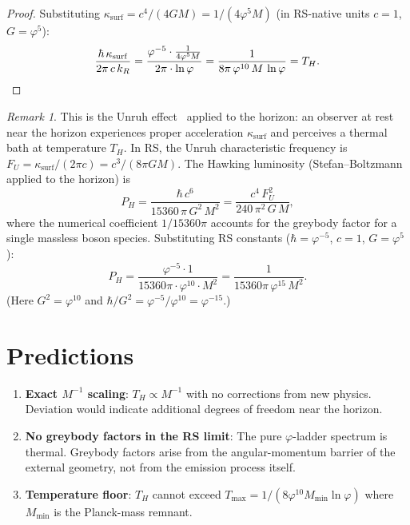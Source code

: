 \documentclass[12pt,a4paper]{article}
\theoremstyle{definition}
\theoremstyle{remark}
\newtheorem{remark}[theorem]{Remark}
\begin{document}
\begin{proof}
Substituting $\kappa_{\mathrm{surf}} = c^4/(4GM) = 1/(4\varphi^5 M)$
(in RS-native units $c = 1$, $G = \varphi^5$):
\[
  \frac{\hbar\,\kappa_{\mathrm{surf}}}{2\pi\,c\,k_R}
  = \frac{\varphi^{-5} \cdot \frac{1}{4\varphi^5 M}}{2\pi \cdot \ln\varphi}
  = \frac{1}{8\pi\,\varphi^{10}\,M\,\ln\varphi} = T_H. \qedhere
\]
\end{proof}

\begin{remark}
This is the Unruh effect~\cite{Unruh1976} applied to the horizon:
an observer at rest near the horizon experiences proper acceleration
$\kappa_{\mathrm{surf}}$ and perceives a thermal bath at temperature
$T_H$.  In RS, the Unruh characteristic frequency is
$F_U = \kappa_{\mathrm{surf}}/(2\pi c) = c^3/(8\pi GM)$.
The Hawking luminosity (Stefan--Boltzmann applied to the horizon) is
\begin{equation}
  P_H = \frac{\hbar\,c^6}{15360\,\pi\,G^2\,M^2}
  = \frac{c^4\,F_U^2}{240\,\pi^2\,G\,M},
\end{equation}
where the numerical coefficient $1/15360\pi$ accounts for the
greybody factor for a single massless boson species.  Substituting
RS constants ($\hbar = \varphi^{-5}$, $c = 1$, $G = \varphi^5$):
\[
P_H = \frac{\varphi^{-5} \cdot 1}{15360\pi \cdot \varphi^{10} \cdot M^2}
= \frac{1}{15360\pi\,\varphi^{15}\,M^2}.
\]
(Here $G^2 = \varphi^{10}$ and $\hbar/G^2 = \varphi^{-5}/\varphi^{10}
= \varphi^{-15}$.)
\end{remark}

\section{Predictions}
\label{sec:predictions}

\begin{enumerate}
  \item \textbf{Exact $M^{-1}$ scaling}: $T_H \propto M^{-1}$ with no
  corrections from new physics.  Deviation would indicate additional
  degrees of freedom near the horizon.

  \item \textbf{No greybody factors in the RS limit}: The pure
  $\varphi$-ladder spectrum is thermal.  Greybody factors arise from
  the angular-momentum barrier of the external geometry, not from
  the emission process itself.

  \item \textbf{Temperature floor}: $T_H$ cannot exceed
  $T_{\max} = 1/(8\varphi^{10} M_{\min} \ln\varphi)$ where
  $M_{\min}$ is the Planck-mass remnant.
\end{enumerate}
\end{document}
